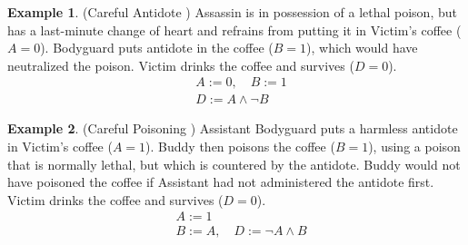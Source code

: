 \documentclass[11pt,a4paper]{book}
\theoremstyle{definition}
\theoremstyle{definition}
\newtheorem{example}{Example}[section]
\theoremstyle{definition}
\theoremstyle{remark}
\begin{document}
\begin{example}(Careful Antidote  \cite{Weslake2015partialtheory})
Assassin is in possession of a lethal poison, but has a last-minute change of heart and refrains from putting it in Victim’s coffee ($A=0$). Bodyguard puts antidote in the coffee ($B=1$), which would have neutralized the poison. Victim drinks the coffee and survives ($D=0$).
\begin{equation*}
\begin{split}
&A:=0, \quad B:=1 \\
&D:= A\land \neg B
\end{split}
\end{equation*}
\begin{center}
\end{center}
\end{example}


\begin{example}(Careful Poisoning \cite{Weslake2015partialtheory})
Assistant Bodyguard puts a harmless antidote in Victim’s coffee ($A=1$). Buddy then poisons the coffee ($B=1$), using a poison that is normally lethal, but which is countered by the antidote. Buddy would not have poisoned the coffee if Assistant had not administered the antidote first. Victim drinks the coffee and survives ($D=0$).
\begin{equation*}
\begin{split}
&A:=1 \\
&B:=A, \quad D:=\neg A \land B
\end{split}
\end{equation*}
\begin{center}
\end{center}
\end{example}
\end{document}
